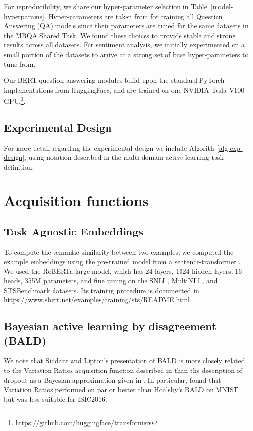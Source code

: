 For reproducibility, we share our hyper-parameter selection in Table~\ref{model-hyperparams}. 
Hyper-parameters are taken from \citet{longpre2019exploration} for training all Question Answering (QA) models since their parameters are tuned for the same datasets in the MRQA Shared Task. 
We found these choices to provide stable and strong results across all datasets.
For sentiment analysis, we initially experimented on a small portion of the datasets to arrive at a strong set of base hyper-parameters to tune from.

Our BERT question answering modules build upon the standard PyTorch \citep{NEURIPS2019_9015} implementations from HuggingFace, and are trained on one NVIDIA Tesla V100 GPU.\footnote{\url{https://github.com/huggingface/transformers}}.



\subsection{Experimental Design}

For more detail regarding the experimental design we include Algorith~\ref{alg:exp-design}, using notation described in the multi-domain active learning task definition.



\section{Acquisition functions}

\subsection{Task Agnostic Embeddings}

To compute the semantic similarity between two examples, we computed the example embeddings using the pre-trained model from a sentence-transformer \citep{reimers-2019-sentence-bert}. 
We used the RoBERTa large model, which has 24 layers, 1024 hidden layers, 16 heads, 355M parameters, and fine tuning on the SNLI \citep{snli:emnlp2015}, MultiNLI \citep{N18-1101}, and STSBenchmark \citep{cer2017semeval} datasets. 
Its training procedure is documented in \url{https://www.sbert.net/examples/training/sts/README.html}. 

\subsection{Bayesian active learning by disagreement (BALD)}
We note that Siddant and Lipton's presentation of BALD is more closely related to the Variation Ratios acquisition function described in \citet{gal2017deep} than the description of dropout as a Bayesian approximation given in \citet{gal2016}. 
In particular, \citet{gal2017deep} found that Variation Ratios performed on par or better than Houlsby's BALD on MNIST but was less suitable for ISIC2016.

